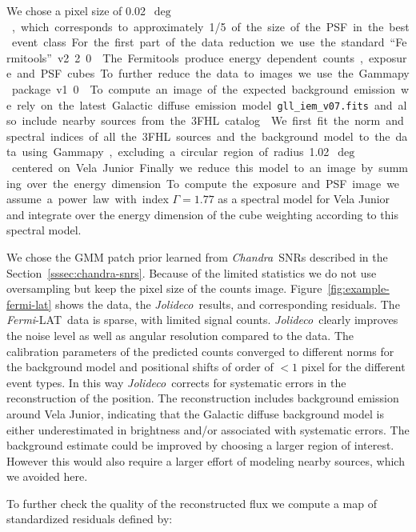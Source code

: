 \documentclass[twocolumn, linenumbers]{aastex631}
\newcommand{\chandra}{\textit{Chandra}~}
\newcommand{\fermi}{\textit{Fermi}-LAT~}
\newcommand{\jolideco}{\textit{Jolideco}~}
\begin{document}
     We chose a pixel size of \qty[mode = text]{0.02}{$\deg$}, which corresponds to approximately 1/5 of the size of the PSF in the best event class. For the first part of the data reduction we use the standard \enquote{Fermitools} v2.2.0 \citep{Fermitools2019}.
    
    The Fermitools produce energy dependent counts, exposure and PSF cubes. To further reduce the data to images we use the Gammapy package v1.0 \citep{GammapyZenodov1.0.1, Gammapy2023}. To compute an image of the expected background emission we rely on the latest Galactic diffuse emission model \texttt{gll\_iem\_v07.fits} and also include nearby sources from the 3FHL catalog \citep{Ajello2017}. We first fit the norm and spectral indices of all the 3FHL sources and the background model to the data using Gammapy, excluding a circular region of radius \qty[mode = text]{1.02}{$\deg$} centered on Vela Junior. Finally we reduce this model to an image by summing over the energy dimension. To compute the exposure and PSF image we assume a power law with index $\Gamma=1.77$ \citep{Ajello2017} as a spectral model for Vela Junior and integrate over the energy dimension of the cube weighting according to this spectral model.
    
    We chose the GMM patch prior learned from \chandra SNRs described in the Section~\ref{sssec:chandra-snrs}. Because of the limited statistics we do not use oversampling but keep the pixel size of the counts image. Figure~\ref{fig:example-fermi-lat} shows the data,  the \jolideco results, and corresponding residuals. The \fermi data is sparse, with limited signal counts. \jolideco clearly improves the noise level as well as angular resolution compared to the data. The calibration parameters of the predicted counts converged to different norms for the background model and positional shifts of order of $<1$ pixel for the different event types. In this way \jolideco corrects for systematic errors in the reconstruction of the position. The reconstruction includes background emission around Vela Junior, indicating that the Galactic diffuse background model is either underestimated in brightness and/or associated with systematic errors. The background estimate could be improved by choosing a larger region of interest. However this would also require a larger effort of modeling nearby sources, which we avoided here.
    
    To further check the quality of the reconstructed flux we compute a map of standardized residuals defined by:
\end{document}
